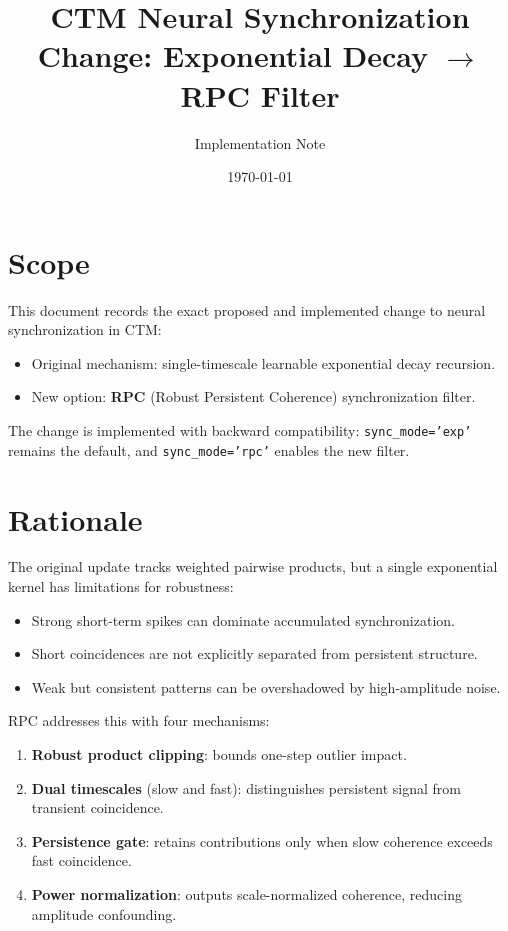 \documentclass[11pt]{article}
\title{CTM Neural Synchronization Change: Exponential Decay $\rightarrow$ RPC Filter}
\author{Implementation Note}
\date{\today}
\begin{document}
\maketitle

\section{Scope}
This document records the exact proposed and implemented change to neural synchronization in CTM:
\begin{itemize}
  \item Original mechanism: single-timescale learnable exponential decay recursion.
  \item New option: \textbf{RPC} (Robust Persistent Coherence) synchronization filter.
\end{itemize}
The change is implemented with backward compatibility:
\texttt{sync\_mode='exp'} remains the default, and \texttt{sync\_mode='rpc'} enables the new filter.

\section{Rationale}
The original update tracks weighted pairwise products, but a single exponential kernel has limitations for robustness:
\begin{itemize}
  \item Strong short-term spikes can dominate accumulated synchronization.
  \item Short coincidences are not explicitly separated from persistent structure.
  \item Weak but consistent patterns can be overshadowed by high-amplitude noise.
\end{itemize}

RPC addresses this with four mechanisms:
\begin{enumerate}
  \item \textbf{Robust product clipping}: bounds one-step outlier impact.
  \item \textbf{Dual timescales} (slow and fast): distinguishes persistent signal from transient coincidence.
  \item \textbf{Persistence gate}: retains contributions only when slow coherence exceeds fast coincidence.
  \item \textbf{Power normalization}: outputs scale-normalized coherence, reducing amplitude confounding.
\end{enumerate}
\end{document}
